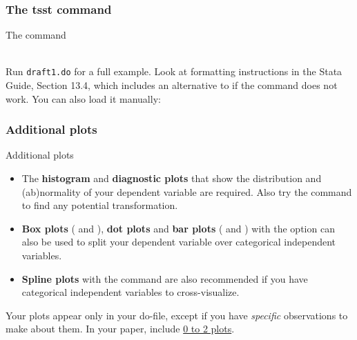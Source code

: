 \documentclass{beamer}
\begin{document}
	\subsubsection{The tsst command}

	\begin{frame}[t]{The  command}
		
		
		
		
		
		
		\\[1em]
		
		Run \texttt{draft1.do} for a full example. Look at formatting instructions in the Stata Guide, Section 13.4, which includes an alternative to  if the command does not work. You can also load it manually:\\[1em]
		
		
	
	\end{frame}

	\subsubsection{Additional plots}

	\begin{frame}[t]{Additional plots}
		
		\begin{itemize}			
			\item The \textbf{histogram} and \textbf{diagnostic plots} that show the distribution and (ab)normality of your dependent variable are required. Also try the  command to find any potential transformation.

			\item \textbf{Box plots} ( and ), \textbf{dot plots} and \textbf{bar plots} ( and ) with the  option can also be used to split your dependent variable over categorical independent variables.
			
			\item \textbf{Spline plots} with the  command are also recommended if you have categorical independent variables to cross-visualize.
		\end{itemize}
	
		Your plots appear only in your do-file, except if you have \emph{specific} observations to make about them. In your paper, include \underline{0 to 2 plots}.
		
	\end{frame}
\end{document}
